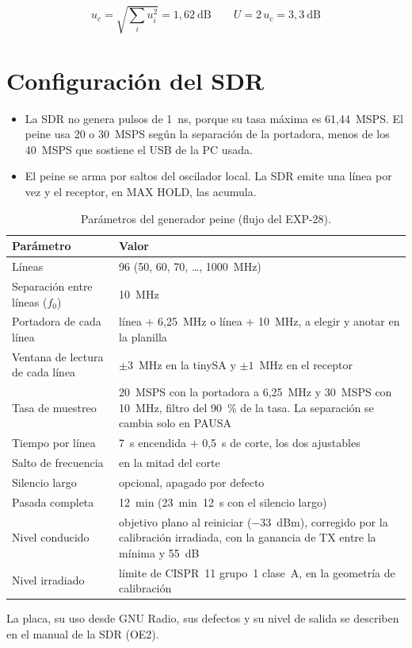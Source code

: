 \documentclass[11pt,a4paper]{article}
\begin{document}
\begin{equation}
  u_c = \sqrt{\textstyle\sum_i u_i^2} = 1{,}62~\text{dB} \qquad U = 2\,u_c = 3{,}3~\text{dB}
\end{equation}


\section{Configuración del SDR}\label{sec:sdr}

\begin{itemize}
  \item La SDR no genera pulsos de 1~ns, porque su tasa máxima es 61,44~MSPS. El peine usa 20 o 30~MSPS según la separación de la portadora, menos de los 40~MSPS que sostiene el USB de la PC usada.
  \item El peine se arma por saltos del oscilador local. La SDR emite una línea por vez y el receptor, en MAX HOLD, las acumula.
\end{itemize}

\begin{table}[H]
  \centering
  \begin{tabular}{@{}lp{8.6cm}@{}}
    \toprule
    Parámetro & Valor \\
    \midrule
    Líneas                          & 96 (50, 60, 70, \dots, 1000~MHz) \\
    Separación entre líneas ($f_0$) & 10~MHz \\
    Portadora de cada línea         & línea + 6,25~MHz o línea + 10~MHz, a elegir y anotar en la planilla \\
    Ventana de lectura de cada línea & $\pm 3$~MHz en la tinySA y $\pm 1$~MHz en el receptor \\
    Tasa de muestreo                & 20~MSPS con la portadora a 6,25~MHz y 30~MSPS con 10~MHz, filtro del 90~\% de la tasa. La separación se cambia solo en PAUSA \\
    Tiempo por línea                & 7~s encendida + 0,5~s de corte, los dos ajustables \\
    Salto de frecuencia             & en la mitad del corte \\
    Silencio largo                  & opcional, apagado por defecto \\
    Pasada completa                 & 12~min (23~min~12~s con el silencio largo) \\
    Nivel conducido                 & objetivo plano al reiniciar ($-33$~dBm), corregido por la calibración irradiada, con la ganancia de TX entre la mínima y 55~dB \\
    Nivel irradiado                 & límite de CISPR~11 grupo~1 clase~A, en la geometría de calibración \\
    \bottomrule
  \end{tabular}
  \caption{Parámetros del generador peine (flujo del EXP-28).}
\end{table}

La placa, su uso desde GNU Radio, sus defectos y su nivel de salida se describen en el manual de la SDR (OE2).
\end{document}
